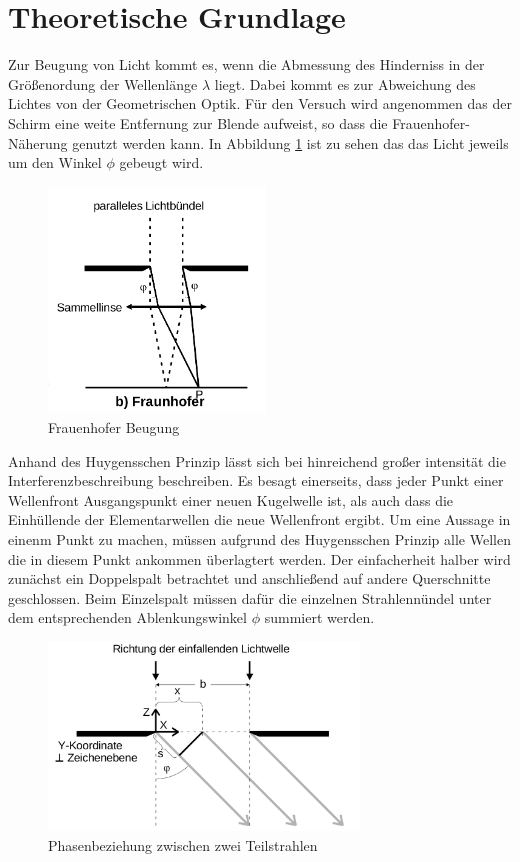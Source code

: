 \section{Theoretische Grundlage}
\label{sec:Theorie}
Zur Beugung von Licht kommt es, wenn die Abmessung des Hinderniss in der Größenordung der Wellenlänge $\lambda$ liegt. Dabei kommt es zur Abweichung des Lichtes von der Geometrischen Optik. Für den Versuch wird angenommen das der Schirm eine weite Entfernung zur  Blende aufweist, so dass die Frauenhofer-Näherung genutzt werden kann. In Abbildung \ref{fig:Fra} ist zu sehen das das Licht jeweils um den Winkel $\phi$ gebeugt wird. 
\begin{figure}
  \centering
  \includegraphics[height=6cm]{picture/Frauenhofer.png}
  \caption{Frauenhofer Beugung}
  \label{fig:Fra}
\end{figure}
Anhand des Huygensschen Prinzip lässt sich bei hinreichend großer intensität die Interferenzbeschreibung beschreiben. Es besagt einerseits, dass jeder Punkt einer Wellenfront Ausgangspunkt einer neuen Kugelwelle ist, als auch dass die Einhüllende der Elementarwellen die neue Wellenfront ergibt. Um eine Aussage in einenm Punkt zu machen, müssen aufgrund des Huygensschen Prinzip alle Wellen die in diesem Punkt ankommen überlagtert werden. Der einfacherheit halber wird zunächst ein Doppelspalt betrachtet und anschließend auf andere Querschnitte geschlossen. Beim Einzelspalt müssen dafür die einzelnen Strahlennündel  unter dem entsprechenden Ablenkungswinkel $\phi$ summiert werden.
\begin{figure}
  \centering
  \includegraphics[height=5cm]{picture/doppelspalt.png}
  \caption{Phasenbeziehung zwischen zwei Teilstrahlen}
  \label{fig:dop}
\end{figure}
